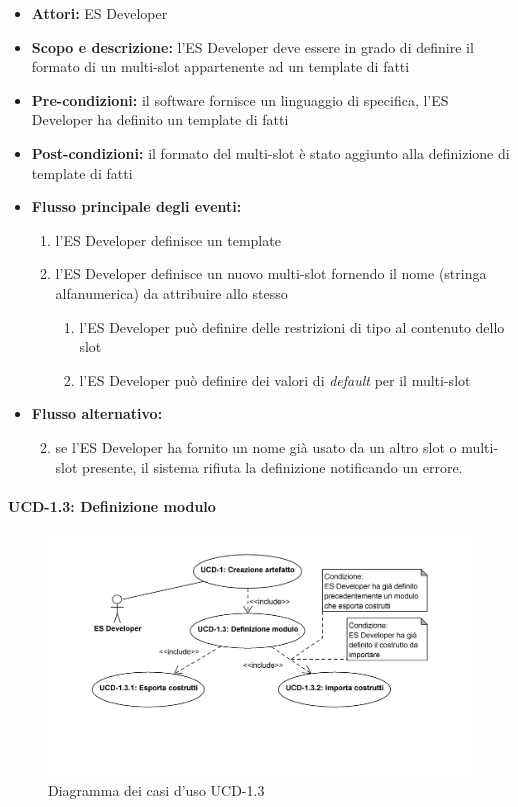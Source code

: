 \begin{itemize}
	\item \textbf{Attori:} ES Developer
	\item \textbf{Scopo e descrizione:} l'ES Developer deve essere in grado di definire il formato di un multi-slot appartenente ad un template di fatti
	\item \textbf{Pre-condizioni:} il software fornisce un linguaggio di specifica, l'ES Developer ha definito un template di fatti
	\item \textbf{Post-condizioni:} il formato del multi-slot è stato aggiunto alla definizione di template di fatti
	\item \textbf{Flusso principale degli eventi:}
		\begin{enumerate}
			\item l'ES Developer definisce un template
			\item l'ES Developer definisce un nuovo multi-slot fornendo il nome (stringa alfanumerica) da attribuire allo stesso
			\begin{enumerate}
				\item l'ES Developer può definire delle restrizioni di tipo al contenuto dello slot
				\item l'ES Developer può definire dei valori di \emph{default} per il multi-slot
			\end{enumerate}
		\end{enumerate}
	\item \textbf{Flusso alternativo:} 
		\begin{enumerate}
			\setcounter{enumi}{1}
			\item se l'ES Developer ha fornito un nome già usato da un altro slot o multi-slot presente, il sistema rifiuta la definizione notificando un errore.
		\end{enumerate}
\end{itemize}


\paragraph{UCD-1.3: Definizione modulo}

\begin{figure}[h]
\centering
\includegraphics[width=1\textwidth]{Immagini/Capitolo2/UseCases/UCD-1_3.png}
\caption{Diagramma dei casi d'uso UCD-1.3}\label{fig:uc-ucd-1.3}
\end{figure}

